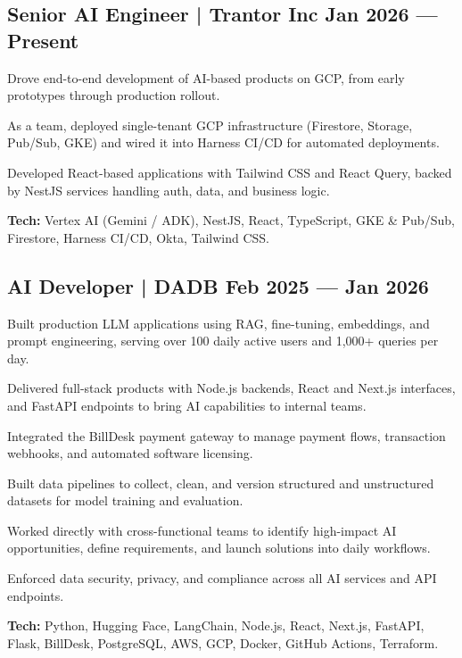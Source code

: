 \subsection[Senior AI Engineer | Trantor Inc (Jan 2026 --- Present)]{Senior AI Engineer | Trantor Inc \texorpdfstring{\hfill}{ } Jan 2026 --- Present}
\begin{zitemize}
    \item Drove end-to-end development of AI-based products on GCP, from early prototypes through production rollout.
    \item As a team, deployed single-tenant GCP infrastructure (Firestore, Storage, Pub/Sub, GKE) and wired it into Harness CI/CD for automated deployments.
    \item Developed React-based applications with Tailwind CSS and React Query, backed by NestJS services handling auth, data, and business logic.
    \item \textbf{Tech:} Vertex AI (Gemini / ADK), NestJS, React, TypeScript, GKE \& Pub/Sub, Firestore, Harness CI/CD, Okta, Tailwind CSS.
\end{zitemize}

\subsection[AI Developer | DADB (Feb 2025 --- Jan 2026)]{AI Developer | DADB \texorpdfstring{\hfill}{ } Feb 2025 --- Jan 2026}
\begin{zitemize}
    \item Built production LLM applications using RAG, fine-tuning, embeddings, and prompt engineering, serving over 100 daily active users and 1,000+ queries per day.
    \item Delivered full-stack products with Node.js backends, React and Next.js interfaces, and FastAPI endpoints to bring AI capabilities to internal teams.
    \item Integrated the BillDesk payment gateway to manage payment flows, transaction webhooks, and automated software licensing.
    \item Built data pipelines to collect, clean, and version structured and unstructured datasets for model training and evaluation.
    \item Worked directly with cross-functional teams to identify high-impact AI opportunities, define requirements, and launch solutions into daily workflows.
    \item Enforced data security, privacy, and compliance across all AI services and API endpoints.
    \item \textbf{Tech:} Python, Hugging Face, LangChain, Node.js, React, Next.js, FastAPI, Flask, BillDesk, PostgreSQL, AWS, GCP, Docker, GitHub Actions, Terraform.
\end{zitemize}

